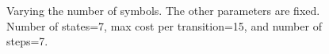 \begin{figure}[H]

  \caption{Varying the number of symbols. The other parameters are fixed. Number of states=7, max cost per transition=15, and number of steps=7.}\label{fig:symbols}
\end{figure}
